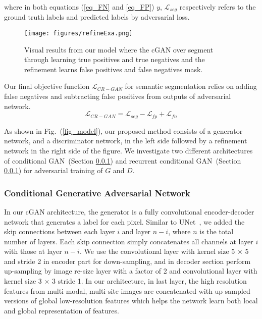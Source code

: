 \documentclass[10pt,twocolumn,letterpaper]{article}
\begin{document}
where in both equations (\ref{eq_FN} and \ref{eq_FP}) $y$, $\mathcal{L}_{seg}$ respectively refers to the ground truth labels and predicted labels by adversarial loss.

\begin{figure}[!t]
\texttt{[image: figures/refineExa.png]}
\centering
\caption{Visual results from our model where the cGAN over segment through learning true positives and true negatives and the refinement learns false positives and false negatives mask.}
\label{fig_mask}
\end{figure}

Our final objective function $\mathcal{L}_{CR-GAN}$ for semantic segmentation relies on adding false negatives and subtracting false positives from outputs of adversarial network.
\begin{equation} \label{final_loss}
\mathcal{L}_{CR-GAN} = {\mathcal{L}_{seg} - \mathcal{L}_{fp} + \mathcal{L}_{fn}  }
\end{equation}%

As shown in Fig.~(\ref{fig_model}), our proposed method consists of a generator network, and a discriminator network, in the left side followed by a refinement network in the right side of the figure.
We investigate two different architectures of conditional GAN~(Section \ref{method_sec1a}) and recurrent conditional GAN~(Section \ref{method_sec1a}) for adversarial training of $G$ and $D$.

\subsubsection{Conditional Generative Adversarial Network}\label{method_sec1a}
In our cGAN architecture, the generator is a fully convolutional encoder-decoder network that generates a label for each pixel.
Similar to UNet~\cite{ronneberger2015u}, we added the skip connections between each layer $i$ and layer $n-i$, where $n$ is the total number of layers.
Each skip connection simply concatenates all channels at layer $i$ with those at layer $n-i$.
We use the convolutional layer with kernel size 5 $\times$ 5 and stride 2 in encoder part for down-sampling,
and in decoder section  perform up-sampling by image re-size layer with a factor of 2 and convolutional layer with kernel size 3 $\times$ 3 stride 1.
In our architecture, in last layer, the high resolution features from multi-modal, multi-site images are concatenated with up-sampled versions of global low-resolution features which helps the network learn both local and global representation of features.
\end{document}
